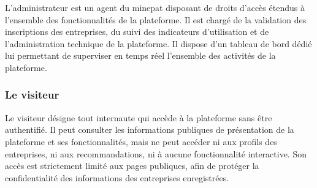 \documentclass[12pt, a4paper, oneside]{report}
\begin{document}
	L'administrateur est un agent du \gls{minepat} disposant de
	droits d'accès étendus à l'ensemble des fonctionnalités de la
	plateforme. Il est chargé de la validation des inscriptions des
	entreprises, du suivi
	des indicateurs d'utilisation et de l'administration technique
	de la plateforme. Il dispose d'un tableau de bord dédié lui
	permettant de superviser en temps réel l'ensemble des activités
	de la plateforme.
	
	\subsubsection{Le visiteur}
	
	Le visiteur désigne tout internaute qui accède à la plateforme
	sans être authentifié. Il peut consulter les informations
	publiques de présentation de la plateforme et ses fonctionnalités,
	mais ne peut accéder ni aux profils des entreprises, ni aux
	recommandations, ni à aucune fonctionnalité interactive. Son
	accès est strictement limité aux pages publiques, afin de
	protéger la confidentialité des informations des entreprises
	enregistrées.
	
\end{document}
